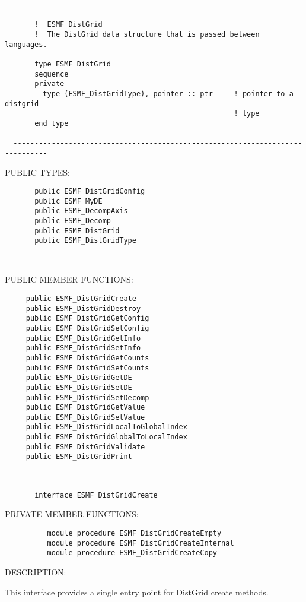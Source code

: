 \begin{verbatim}
  ------------------------------------------------------------------------------
       !  ESMF_DistGrid
       !  The DistGrid data structure that is passed between languages.
 
       type ESMF_DistGrid
       sequence
       private
         type (ESMF_DistGridType), pointer :: ptr     ! pointer to a distgrid
                                                      ! type
       end type
 
  ------------------------------------------------------------------------------\end{verbatim}{\sf PUBLIC TYPES:}
\begin{verbatim}       public ESMF_DistGridConfig
       public ESMF_MyDE
       public ESMF_DecompAxis
       public ESMF_Decomp
       public ESMF_DistGrid
       public ESMF_DistGridType
  ------------------------------------------------------------------------------\end{verbatim}{\sf PUBLIC MEMBER FUNCTIONS:}
\begin{verbatim}     public ESMF_DistGridCreate
     public ESMF_DistGridDestroy
     public ESMF_DistGridGetConfig
     public ESMF_DistGridSetConfig
     public ESMF_DistGridGetInfo
     public ESMF_DistGridSetInfo
     public ESMF_DistGridGetCounts
     public ESMF_DistGridSetCounts
     public ESMF_DistGridGetDE
     public ESMF_DistGridSetDE
     public ESMF_DistGridSetDecomp
     public ESMF_DistGridGetValue
     public ESMF_DistGridSetValue
     public ESMF_DistGridLocalToGlobalIndex
     public ESMF_DistGridGlobalToLocalIndex
     public ESMF_DistGridValidate
     public ESMF_DistGridPrint
  \end{verbatim}
 
 
\mbox{}\hrulefill\ 
 

\begin{verbatim}       interface ESMF_DistGridCreate 
 \end{verbatim}{\sf PRIVATE MEMBER FUNCTIONS:}
\begin{verbatim}          module procedure ESMF_DistGridCreateEmpty
          module procedure ESMF_DistGridCreateInternal
          module procedure ESMF_DistGridCreateCopy
 \end{verbatim}
{\sf DESCRIPTION:\\ }


       This interface provides a single entry point for DistGrid create
       methods.
   
